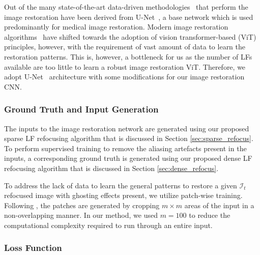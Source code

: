 
Out of the many state-of-the-art data-driven methodologies~\cite{hinet,mprnet} that perform the image restoration have been derived from U-Net~\cite{unet}, a base network which is used predominantly for medical image restoration. Modern image restoration algorithms~\cite{swinir} have shifted towards the adoption of vision transformer-based (ViT) principles, however, with the requirement of vast amount of data to learn the restoration patterns. This is, however, a bottleneck for us as the number of LFs available are too little to learn a robust image restoration ViT. Therefore, we adopt U-Net~\cite{unet} architecture with some modifications for our image restoration CNN.

\subsubsection{Ground Truth and Input Generation}
The inputs to the image restoration network are generated using our proposed sparse LF refocusing algorithm that is discussed in Section \ref{sec:sparse_refocus}. To perform supervised training to remove the aliasing artefacts present in the inputs, a corresponding ground truth is generated using our proposed dense LF refocusing algorithm that is discussed in Section \ref{sec:dense_refocus}. 


To address the lack of data to learn the general patterns to restore a given  $\mathcal{I}_t$ refocused image with ghosting effects present, we utilize patch-wise training. Following \cite{deep_sparse}, the patches are generated by cropping $m \times m$ areas of the input in a non-overlapping manner. In our method, we used $m=100$ to reduce the computational complexity required to run through an entire input. 

\subsubsection{Loss Function}

